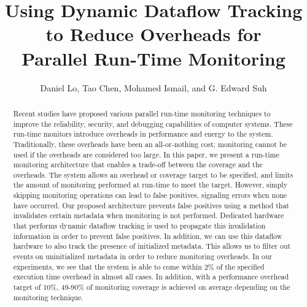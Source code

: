 \title{
Using Dynamic Dataflow Tracking to Reduce Overheads for \\ Parallel
Run-Time Monitoring
}

{\author{Daniel Lo, Tao Chen, Mohamed Ismail, and G. Edward Suh}}

\date{}
\maketitle

\thispagestyle{empty}

\begin{abstract}

Recent studies have proposed various parallel run-time monitoring techniques to
improve the reliability, security, and debugging capabilities of
computer systems. These run-time monitors introduce overheads in performance
and energy to the system. Traditionally, these overheads have been an
all-or-nothing cost; monitoring cannot be used if the overheads are considered too large.
In this paper, we present a run-time monitoring architecture that
enables a trade-off between the coverage and the overheads.
The system allows an overhead or coverage target to be specified,
and limits the amount of monitoring performed at run-time to meet the target. 
However, simply skipping monitoring operations can lead to false
positives, signaling errors when none have occurred. Our proposed architecture
prevents false positives using a method that invalidates certain metadata
when monitoring is not performed. Dedicated hardware that performs dynamic
dataflow tracking is used to propagate this invalidation
information in order to prevent false positives. In addition, we can use this
dataflow hardware to also track the presence of initialized metadata. This
allows us to filter out events on uninitialized metadata in order to reduce
monitoring overheads.
In our experiments, we see that the system is able to come within 2\% of the
specified execution time overhead in almost all cases.  In addition, with a
performance overhead target of 10\%, 49-90\% of monitoring coverage is achieved
on average depending on the monitoring technique.

\end{abstract}
